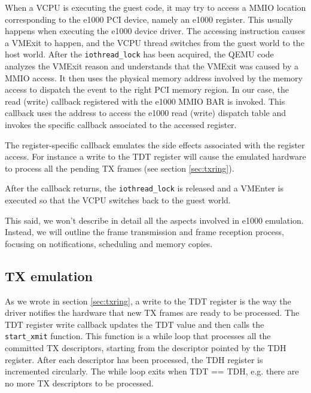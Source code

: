 When a VCPU is executing the guest code, it may try to access a MMIO location corresponding to the e1000 PCI device, namely an e1000
register. This usually happens when executing the e1000 device driver.
The accessing instruction causes a VMExit to happen, and the VCPU thread switches from the guest world to the host world. 
After the \texttt{iothread\_lock} has been acquired, the QEMU code analyzes the VMExit reason and understands that the VMExit was caused
by a MMIO access.
It then uses the physical memory address involved by the memory access to dispatch the event to the right PCI memory region.
In our case, the read (write) callback registered with the e1000 MMIO BAR is invoked. This callback uses the address to access the 
e1000 read (write) dispatch table and invokes the specific callback associated to the accessed register.

The register-specific callback emulates the side effects associated with the register access. For instance a write to the TDT
register will cause the emulated hardware to process all the pending TX frames (see section \ref{sec:txring}).

After the callback returns, the \texttt{iothread\_lock} is released and a VMEnter is executed so that the VCPU switches back to the 
guest world.

\vspace{0.5cm}

This said, we won't describe in detail all the aspects involved in e1000 emulation. Instead, we will outline the frame
transmission and frame reception process, focusing on notifications, scheduling and memory copies.


\subsection{TX emulation}
As we wrote in section \ref{sec:txring}, a write to the TDT register is the way the driver notifies the hardware that new TX frames 
are ready to be processed.
The TDT register write callback updates the TDT value and then calls the \texttt{start\_xmit} function. This function is a while
loop that processes all the committed TX descriptors, starting from the descriptor pointed by the TDH register. After each
descriptor has been processed, the TDH register is incremented circularly. The while loop exits when TDT == TDH, e.g. there
are no more TX descriptors to be processed.

